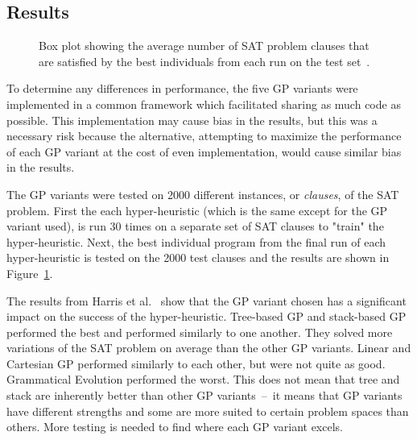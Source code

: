 \documentclass{sig-alternate}
\begin{document}
\subsection{Results}
\label{sec:gpresults}
\begin{figure}
	\centering
	\caption{Box plot showing the average number of SAT problem clauses that are satisfied by the best individuals from each run on the test set~\cite{harris:2015}.}
	\label{fig:gpvariants}
\end{figure}

To determine any differences in performance, the five GP variants were implemented in a common framework which facilitated sharing as much code as possible. This implementation may cause bias in the results, but this was a necessary risk because the alternative, attempting to maximize the performance of each GP variant at the cost of even implementation, would cause similar bias in the results.~\cite{harris:2015}

The GP variants were tested on 2000 different instances, or \textit{clauses}, of the SAT problem. First the each hyper-heuristic (which is the same except for the GP variant used), is run 30 times on a separate set of SAT clauses to "train" the hyper-heuristic. Next, the best individual program from the final run of each hyper-heuristic is tested on the 2000 test clauses and the results are shown in Figure~\ref{fig:gpvariants}.

The results from Harris et al.~\cite{harris:2015} show that the GP variant chosen has a significant impact on the success of the hyper-heuristic. Tree-based GP and stack-based GP performed the best and performed similarly to one another. They solved more variations of the SAT problem on average than the other GP variants. Linear and Cartesian GP performed similarly to each other, but were not quite as good. Grammatical Evolution performed the worst. This does not mean that tree and stack are inherently better than other GP variants~--~it means that GP variants have different strengths and some are more suited to certain problem spaces than others. More testing is needed to find where each GP variant excels.
\end{document}
